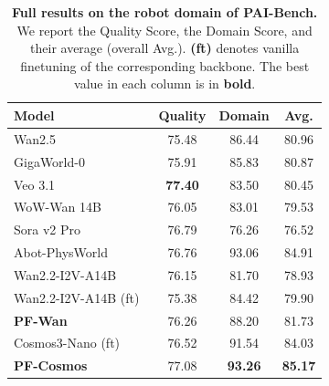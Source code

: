 \begin{table}[t]
\centering
\renewcommand{\arraystretch}{1.15}
\setlength{\tabcolsep}{10pt}
\caption{\textbf{Full results on the robot domain of PAI-Bench.} We report the Quality Score, the Domain Score, and their average (overall Avg.). \textbf{(ft)} denotes vanilla finetuning of the corresponding backbone. The best value in each column is in \textbf{bold}.}
\label{tab:paibench_full}
\begin{tabular}{l ccc}
\toprule
\textbf{Model} & \textbf{Quality} & \textbf{Domain} & \textbf{Avg.} \\
\midrule
Wan2.5~\cite{wan2025wan}            & 75.48 & 86.44 & 80.96 \\
GigaWorld-0~\cite{team2025gigaworld} & 75.91 & 85.83 & 80.87 \\
Veo 3.1~\cite{GoogleDeepMind2025Veo3} & \textbf{77.40} & 83.50 & 80.45 \\
WoW-Wan 14B~\cite{chi2025wow}        & 76.05 & 83.01 & 79.53 \\
Sora v2 Pro~\cite{openai2025sora2}   & 76.79 & 76.26 & 76.52 \\
Abot-PhysWorld~\cite{ali2025abot}    & 76.76 & 93.06 & 84.91 \\
Wan2.2-I2V-A14B~\cite{wan2025wan}        & 76.15 & 81.70 & 78.93 \\
\midrule
Wan2.2-I2V-A14B (ft)~\cite{wan2025wan}   & 75.38 & 84.42 & 79.90 \\
\quad \textbf{PF-Wan}                & 76.26 & 88.20 & 81.73 \\
Cosmos3-Nano (ft)                    & 76.52 & 91.54 & 84.03 \\
\quad \textbf{PF-Cosmos}             & 77.08 & \textbf{93.26} & \textbf{85.17} \\
\bottomrule
\end{tabular}
\end{table}
